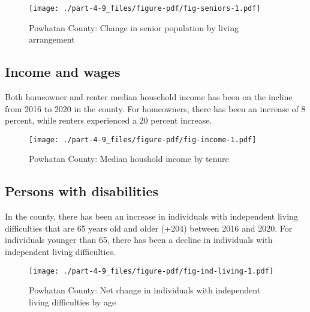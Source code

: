 \documentclass[
  letterpaper,
  DIV=11,
  numbers=noendperiod]{scrreprt}
\begin{document}
\begin{figure}

{\centering \texttt{[image: ./part-4-9\_files/figure-pdf/fig-seniors-1.pdf]}

}

\caption{\label{fig-seniors}Powhatan County: Change in senior population
by living arrangement}

\end{figure}

\hypertarget{income-and-wages-8}{%
\subsection{Income and wages}\label{income-and-wages-8}}

Both homeowner and renter median household income has been on the
incline from 2016 to 2020 in the county. For homeowners, there has been
an increase of 8 percent, while renters experienced a 20 percent
increase.

\begin{figure}

{\centering \texttt{[image: ./part-4-9\_files/figure-pdf/fig-income-1.pdf]}

}

\caption{\label{fig-income}Powhatan County: Median houshold income by
tenure}

\end{figure}

\hypertarget{persons-with-disabilities-7}{%
\subsection{Persons with
disabilities}\label{persons-with-disabilities-7}}

In the county, there has been an increase in individuals with
independent living difficulties that are 65 years old and older (+204)
between 2016 and 2020. For individuals younger than 65, there has been a
decline in individuals with independent living difficulties.

\begin{figure}

{\centering \texttt{[image: ./part-4-9\_files/figure-pdf/fig-ind-living-1.pdf]}

}

\caption{\label{fig-ind-living}Powhatan County: Net change in
individuals with independent living difficulties by age}

\end{figure}
\end{document}
